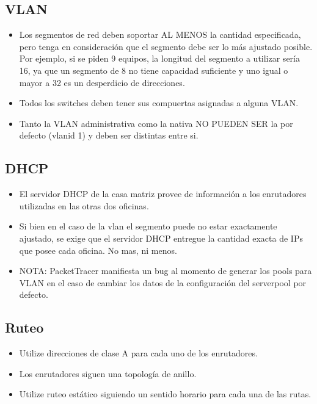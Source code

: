 \documentclass[11pt]{utalcaDoc}
\begin{document}
\subsection{VLAN}
\begin{itemize}
\item{Los segmentos de red deben soportar AL MENOS la cantidad especificada, pero tenga en consideración que el segmento debe ser lo más ajustado posible. Por ejemplo, si se piden 9 equipos, la longitud del segmento a utilizar sería 16, ya que un segmento de 8 no tiene capacidad suficiente y uno igual o mayor a 32 es un desperdicio de direcciones.}
\item{Todos los switches deben tener sus compuertas asignadas a alguna VLAN.}
\item{Tanto la VLAN administrativa como la nativa NO PUEDEN SER la por defecto (vlanid 1) y deben ser distintas entre si.}
\end{itemize}

\subsection{DHCP}
\begin{itemize}
    \item{El servidor DHCP de la casa matriz provee de información a los enrutadores utilizadas en las otras dos oficinas.}
    \item{Si bien en el caso de la vlan el segmento puede no estar exactamente ajustado, se exige que el servidor DHCP entregue la cantidad exacta de IPs que posee cada oficina. No mas, ni menos.}
    \item{NOTA: PacketTracer manifiesta un bug al momento de generar los pools para VLAN en el caso de cambiar los datos de la configuración del serverpool por defecto.}
\end{itemize}

\subsection{Ruteo}
\begin{itemize}
    \item{Utilize direcciones de clase A para cada uno de los enrutadores.}
    \item{Los enrutadores siguen una topología de anillo.}
    \item{Utilize ruteo estático siguiendo un sentido horario para cada una de las rutas.}
\end{itemize}
\end{document}
